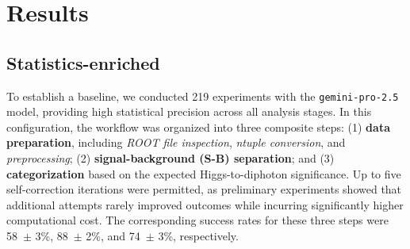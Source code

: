 \documentclass[aps,prd,reprint,superscriptaddress]{revtex4-2}
\begin{document}

\section{Results}
\subsection{Statistics-enriched}
To establish a baseline, we conducted 219 experiments with the \texttt{gemini-pro-2.5} model, providing high statistical precision across all analysis stages. In this configuration, the workflow was organized into three composite steps: (1) \textbf{data preparation}, including \textit{ROOT file inspection}, \textit{ntuple conversion}, and \textit{preprocessing}; (2) \textbf{signal-background (S-B) separation}; and (3) \textbf{categorization} based on the expected Higgs-to-diphoton significance. Up to five self-correction iterations were permitted, as preliminary experiments showed that additional attempts rarely improved outcomes while incurring significantly higher computational cost. The corresponding success rates for these three steps were 58~$\pm$ 3\%, 88~$\pm$ 2\%, and 74~$\pm$ 3\%, respectively.
\end{document}
